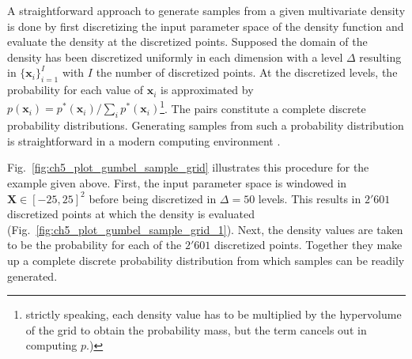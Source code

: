 A straightforward approach to generate samples from a given multivariate density is done by first 
discretizing the input parameter space of the density function and evaluate the density at the discretized points.
Supposed the domain of the density has been discretized uniformly in each dimension with a level $\Delta$ resulting in $\{\bm{x}_i\}_{i=1}^{I}$ with $I$ the number of discretized points.
At the discretized levels, the probability for each value of $\bm{x}_i$ is approximated by $p(\bm{x}_i) = p^*(\bm{x}_i) / \sum_i p^*(\bm{x}_i)$\footnote{strictly speaking, each density value has to be multiplied by the hypervolume of the grid to obtain the probability mass, but the term cancels out in computing $p$.)}.
The pairs constitute a complete discrete probability distributions.
Generating samples from such a probability distribution is straightforward in a modern computing environment \cite{Mackay2005}.

Fig.~\ref{fig:ch5_plot_gumbel_sample_grid} illustrates this procedure for the example given above.
First, the input parameter space is windowed in $\mathbf{X}\in[-25,25]^2$ before being discretized in $\Delta = 50$ levels.
This results in $2'601$ discretized points at which the density is evaluated (Fig.~\ref{fig:ch5_plot_gumbel_sample_grid_1}).
Next, the density values are taken to be the probability for each of the $2'601$ discretized points.
Together they make up a complete discrete probability distribution from which samples can be readily generated.

